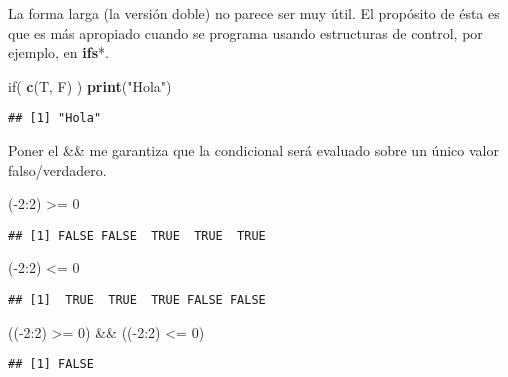 \documentclass[]{article}
\newenvironment{Shaded}{\begin{snugshade}}{\end{snugshade}}
\newcommand{\KeywordTok}[1]{\textcolor[rgb]{0.13,0.29,0.53}{\textbf{{#1}}}}
\newcommand{\DecValTok}[1]{\textcolor[rgb]{0.00,0.00,0.81}{{#1}}}
\newcommand{\StringTok}[1]{\textcolor[rgb]{0.31,0.60,0.02}{{#1}}}
\newcommand{\NormalTok}[1]{{#1}}
\begin{document}
La forma larga (la versión doble) no parece ser muy útil. El propósito
de ésta es que es más apropiado cuando se programa usando estructuras de
control, por ejemplo, en \textbf{ifs}*.

\begin{Shaded}
\begin{Highlighting}[]
\NormalTok{if( }\KeywordTok{c}\NormalTok{(T, F) ) }\KeywordTok{print}\NormalTok{(}\StringTok{"Hola"}\NormalTok{)}
\end{Highlighting}
\end{Shaded}

\begin{verbatim}
## [1] "Hola"
\end{verbatim}

Poner el \&\& me garantiza que la condicional será evaluado sobre un
único valor falso/verdadero.

\begin{Shaded}
\begin{Highlighting}[]
\NormalTok{(-}\DecValTok{2}\NormalTok{:}\DecValTok{2}\NormalTok{) >=}\StringTok{ }\DecValTok{0} 
\end{Highlighting}
\end{Shaded}

\begin{verbatim}
## [1] FALSE FALSE  TRUE  TRUE  TRUE
\end{verbatim}

\begin{Shaded}
\begin{Highlighting}[]
\NormalTok{(-}\DecValTok{2}\NormalTok{:}\DecValTok{2}\NormalTok{) <=}\StringTok{ }\DecValTok{0}
\end{Highlighting}
\end{Shaded}

\begin{verbatim}
## [1]  TRUE  TRUE  TRUE FALSE FALSE
\end{verbatim}

\begin{Shaded}
\begin{Highlighting}[]
\NormalTok{((-}\DecValTok{2}\NormalTok{:}\DecValTok{2}\NormalTok{) >=}\StringTok{ }\DecValTok{0}\NormalTok{) &&}\StringTok{ }\NormalTok{((-}\DecValTok{2}\NormalTok{:}\DecValTok{2}\NormalTok{) <=}\StringTok{ }\DecValTok{0}\NormalTok{)}
\end{Highlighting}
\end{Shaded}

\begin{verbatim}
## [1] FALSE
\end{verbatim}
\end{document}
